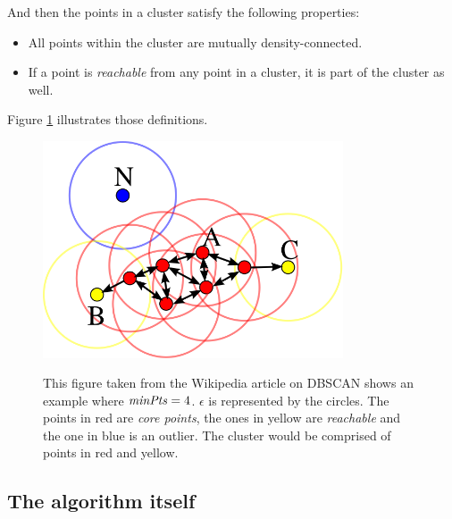 And then the points in a cluster satisfy the following properties\cite{dbscan}:
\begin{itemize}
	\item All points within the cluster are mutually density-connected.
	\item If a point is \emph{reachable} from any point in a cluster, it is part of the cluster as well.
\end{itemize}

Figure \ref{fig:reachExample} illustrates those definitions.

\begin{figure}
\centering
{\includegraphics[width=3.5in]{images/reach_example.png}}
\caption{This figure taken from the Wikipedia article on DBSCAN \cite{dbscan} shows an example where $\mathit{minPts}=4$. $\epsilon$ is represented by the circles. The points in red are \emph{core points}, the ones in yellow are \emph{reachable} and the one in blue is an outlier. The cluster would be comprised of points in red and yellow.}
\label{fig:reachExample}
\end{figure}

\subsection{The algorithm itself}


